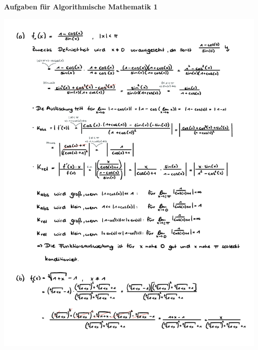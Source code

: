 \documentclass[a4paper,oneside,11pt]{scrartcl}
\begin{document}

\begin{center}
{\Large{\textbf{Aufgaben für Algorithmische Mathematik 1}}} \\
\end{center}

\begin{minipage}[t]{\textwidth}
\includegraphics[scale = 0.75, page=1]{AlMa_blatt03.pdf}
\end{minipage}
\pagebreak
\end{document}
